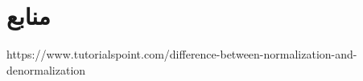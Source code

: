 \documentclass{article}
\begin{document}
\section*{منابع}
\renewcommand{\section}[2]{}%
\begin{thebibliography}{99} %


\begin{LTRitems}

\resetlatinfont

https://www.tutorialspoint.com/difference-between-normalization-and-denormalization
\end{LTRitems}

\end{thebibliography}
\end{document}
